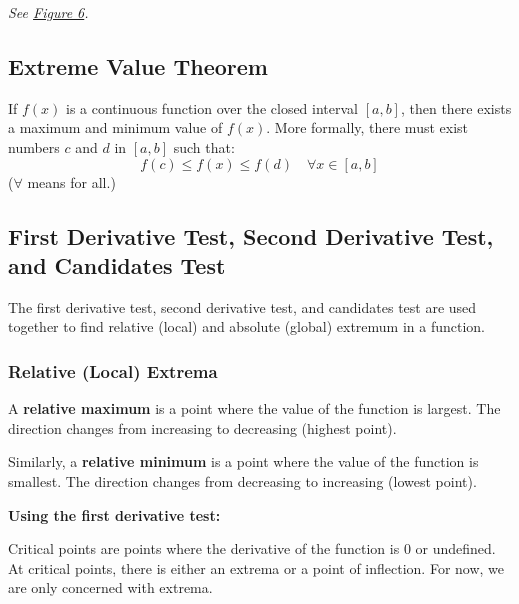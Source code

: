 \documentclass[12pt]{article}
\begin{document}
            \noindent \textit{See \hyperref[fig:meanvaluetheorem]{Figure 6}.}

        \subsection{Extreme Value Theorem}
            If $f(x)$ is a continuous function over the closed interval $[a, b]$, then there exists a maximum and minimum value of $f(x)$. More formally, there must exist numbers $c$ and $d$ in $[a, b]$ such that:
            \[ f(c) \le f(x) \le f(d) \quad \forall x \in [a, b] \]
            ($\forall$ means for all.)

        \subsection[First Derivative Test, Second Derivative Test, and Candidates Test]{First Derivative Test, Second Derivative Test, \\and Candidates Test}
            The first derivative test, second derivative test, and candidates test are used together to find relative (local) and absolute (global) extremum in a function.

            \subsubsection{Relative (Local) Extrema}
                A \textbf{relative maximum} is a point where the value of the function is largest. The direction changes from increasing to decreasing (highest point).

                Similarly, a \textbf{relative minimum} is a point where the value of the function is smallest. The direction changes from decreasing to increasing (lowest point).

                \noindent \textbf{Using the first derivative test:}

                Critical points are points where the derivative of the function is $0$ or undefined. At critical points, there is either an extrema or a point of inflection. For now, we are only concerned with extrema.
\end{document}
